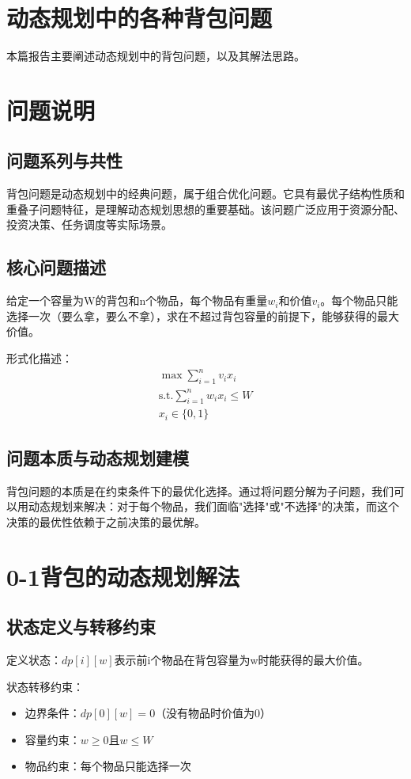 \section*{动态规划中的各种背包问题}
本篇报告主要阐述动态规划中的背包问题，以及其解法思路。


\section{问题说明}

\subsection{问题系列与共性}
背包问题是动态规划中的经典问题，属于组合优化问题。它具有最优子结构性质和重叠子问题特征，是理解动态规划思想的重要基础。该问题广泛应用于资源分配、投资决策、任务调度等实际场景。

\subsection{核心问题描述}
给定一个容量为W的背包和n个物品，每个物品有重量$w_i$和价值$v_i$。每个物品只能选择一次（要么拿，要么不拿），求在不超过背包容量的前提下，能够获得的最大价值。

形式化描述：
\begin{align}
\max \sum_{i=1}^{n} v_i x_i \\
\text{s.t.} \sum_{i=1}^{n} w_i x_i \leq W \\
x_i \in \{0, 1\}
\end{align}

\subsection{问题本质与动态规划建模}
背包问题的本质是在约束条件下的最优化选择。通过将问题分解为子问题，我们可以用动态规划来解决：对于每个物品，我们面临"选择"或"不选择"的决策，而这个决策的最优性依赖于之前决策的最优解。

\section{0-1背包的动态规划解法}

\subsection{状态定义与转移约束}
定义状态：$dp[i][w]$表示前i个物品在背包容量为w时能获得的最大价值。

状态转移约束：
\begin{itemize}
\item 边界条件：$dp[0][w] = 0$（没有物品时价值为0）
\item 容量约束：$w \geq 0$且$w \leq W$
\item 物品约束：每个物品只能选择一次
\end{itemize}


